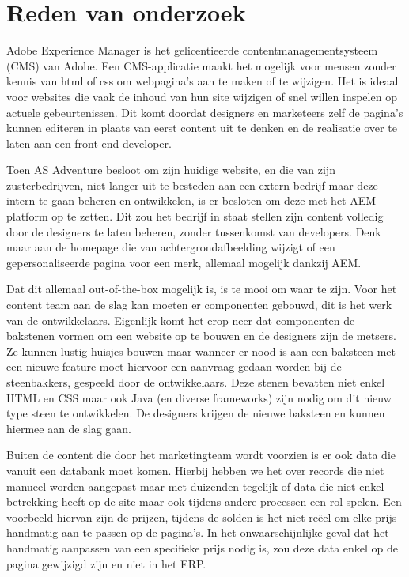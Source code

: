 \documentclass{article}
\begin{document}
	\section{Reden van onderzoek}
	Adobe Experience Manager is het gelicentieerde  contentmanagementsysteem (CMS) van Adobe. 
	Een CMS-applicatie maakt het mogelijk voor mensen zonder kennis van html of css om webpagina’s aan te maken of te wijzigen. 
	Het is ideaal voor websites die vaak de inhoud van hun site wijzigen of snel willen inspelen op actuele gebeurtenissen. 
	Dit komt doordat designers en marketeers zelf de pagina's kunnen editeren in plaats van eerst content uit te denken en de realisatie over te laten aan een front-end developer. 
	\par
	Toen AS Adventure besloot om zijn huidige website, en die van zijn zusterbedrijven, niet langer uit te besteden aan een extern bedrijf maar deze intern te gaan beheren en ontwikkelen, is er besloten om deze met het AEM-platform op te zetten. 
	Dit zou het bedrijf in staat stellen zijn content volledig door de designers te laten beheren, zonder tussenkomst van developers.
	Denk maar aan de homepage die van achtergrondafbeelding wijzigt of een gepersonaliseerde pagina voor een merk, allemaal mogelijk dankzij AEM.
	\par
	Dat dit allemaal out-of-the-box mogelijk is, is te mooi om waar te zijn. Voor het content team aan de slag kan moeten er componenten gebouwd, dit is het werk van de ontwikkelaars. Eigenlijk komt het erop neer dat componenten de bakstenen vormen om een website op te bouwen en de designers zijn de metsers. Ze kunnen lustig huisjes bouwen maar wanneer er nood is aan een baksteen met een nieuwe feature moet hiervoor een aanvraag gedaan worden bij de steenbakkers, gespeeld door de ontwikkelaars. Deze stenen bevatten niet enkel HTML en CSS maar ook Java (en diverse frameworks) zijn nodig om dit nieuw type steen te ontwikkelen. De designers krijgen de nieuwe baksteen en kunnen hiermee aan de slag gaan.
	\par
	Buiten de content die door het marketingteam wordt voorzien is er ook data die vanuit een databank moet komen. 
	Hierbij hebben we het over records die niet manueel worden aangepast maar met duizenden tegelijk of data die niet enkel betrekking heeft op de site maar ook tijdens andere processen een rol spelen. 
	Een voorbeeld hiervan zijn de prijzen, tijdens de solden is het niet reëel om elke prijs handmatig aan te passen op de pagina’s. 
	In het onwaarschijnlijke geval dat het handmatig aanpassen van een specifieke prijs nodig is, zou deze data enkel op de pagina gewijzigd zijn en niet in het ERP. 
\end{document}
